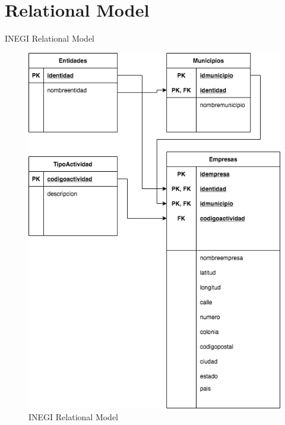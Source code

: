\documentclass[10pt]{article}         %
\begin{document}
\section{Relational Model}
INEGI Relational Model

\begin{figure}[h]
     \includegraphics[scale=0.4]{relational_inegi}
     \caption{INEGI Relational Model}
\end{figure}
\end{document}
